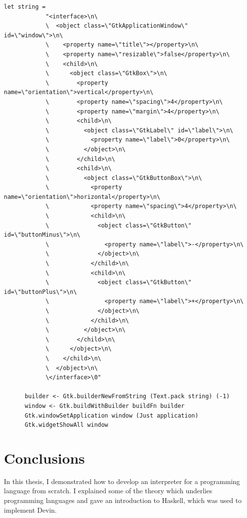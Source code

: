\documentclass[UdineBachThesis,american,11pt]{PhdThesis}
\begin{document}
  \newpage

  \begin{lstlisting}[gobble=4,basicstyle=\ttfamily\small]
      let string =
            "<interface>\n\
            \  <object class=\"GtkApplicationWindow\" id=\"window\">\n\
            \    <property name=\"title\"></property>\n\
            \    <property name=\"resizable\">false</property>\n\
            \    <child>\n\
            \      <object class=\"GtkBox\">\n\
            \        <property name=\"orientation\">vertical</property>\n\
            \        <property name=\"spacing\">4</property>\n\
            \        <property name=\"margin\">4</property>\n\
            \        <child>\n\
            \          <object class=\"GtkLabel\" id=\"label\">\n\
            \            <property name=\"label\">0</property>\n\
            \          </object>\n\
            \        </child>\n\
            \        <child>\n\
            \          <object class=\"GtkButtonBox\">\n\
            \            <property name=\"orientation\">horizontal</property>\n\
            \            <property name=\"spacing\">4</property>\n\
            \            <child>\n\
            \              <object class=\"GtkButton\" id=\"buttonMinus\">\n\
            \                <property name=\"label\">-</property>\n\
            \              </object>\n\
            \            </child>\n\
            \            <child>\n\
            \              <object class=\"GtkButton\" id=\"buttonPlus\">\n\
            \                <property name=\"label\">+</property>\n\
            \              </object>\n\
            \            </child>\n\
            \          </object>\n\
            \        </child>\n\
            \      </object>\n\
            \    </child>\n\
            \  </object>\n\
            \</interface>\0"

      builder <- Gtk.builderNewFromString (Text.pack string) (-1)
      window <- Gtk.buildWithBuilder buildFn builder
      Gtk.windowSetApplication window (Just application)
      Gtk.widgetShowAll window
  \end{lstlisting}

  \chapter{Conclusions}

  In this thesis, I demonstrated how to develop an interpreter for a programming
  language from scratch. I explained some of the theory which underlies
  programming languages and gave an introduction to Haskell, which was used to
  implement Devin.
\end{document}

